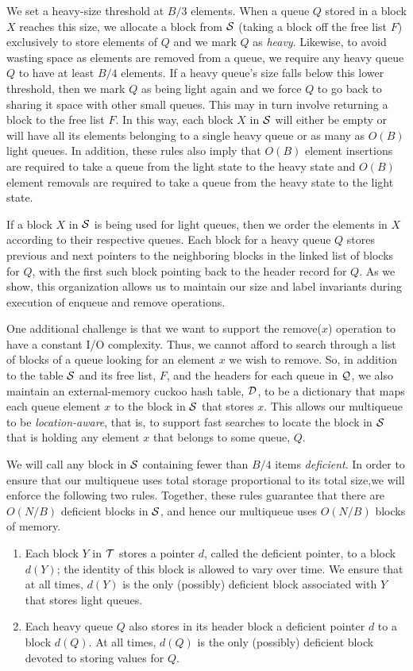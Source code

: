 \documentclass[11pt,letterpaper]{article}
\begin{document}
We set a heavy-size threshold at $B/3$ elements. When a queue $Q$ stored in a block $X$ reaches
this size, we allocate a block from $\cal S$ (taking a block off the free
list $F$) 
exclusively to store elements of $Q$ and we mark $Q$ as \emph{heavy}. 
Likewise, to avoid wasting space as
elements are removed from a queue, we require any heavy queue $Q$ to
have at least $B/4$ elements. If a heavy queue's size falls below this
lower threshold, then we mark $Q$ as being light again
and we force $Q$ to go back to sharing it space with other small queues.
This may in turn involve returning a block to the free list $F$.
In this way,
each block $X$ in $\cal S$ will either be empty or will have all its
elements belonging to a single heavy queue or as many as $O(B)$ light queues.
In addition, these rules also imply that 
$O(B)$ 
element insertions are required to take a queue from the light state to the 
heavy state
and
$O(B)$ 
element removals are required to take a queue from the heavy state to the light
state.

If a block $X$ in $\cal S$ is being used for light queues, 
then we order the elements in $X$ according to their respective queues.
Each block for a heavy queue $Q$ stores previous and next pointers to the
neighboring blocks in the linked list of blocks for $Q$, with 
the first such block pointing back to the header record for $Q$.
As we show, this organization allows us to maintain our size and label
invariants during execution of enqueue and remove operations.

One additional challenge is that we want to support the remove($x$) operation
to have a constant I/O complexity.
Thus, we cannot afford to search through a list of blocks of a queue looking
for an element $x$ we wish to remove.
So, in addition to the table $\cal S$ and its free list, $F$,
and the headers for each queue in $\cal Q$,
we also maintain an external-memory 
cuckoo hash table, $\cal D$, to be a dictionary that
maps each queue element $x$ to the block in $\cal S$ that stores $x$.
This allows our multiqueue to be \emph{location-aware}, that is, to
support fast searches to locate the block in $\cal S$ that is holding
any element $x$ that belongs to some queue, $Q$.

We will call any block in $\cal S$ containing fewer than $B/4$ items \emph{deficient}. 
In order to ensure that our multiqueue uses total storage proportional to its total size,we will enforce the following two rules. Together, these rules guarantee that there are $O(N/B)$ deficient blocks in $\cal S$, and hence our 
multiqueue uses $O(N/B)$ blocks of memory.
\begin{enumerate}
\item Each
block $Y$ in $\cal T$ stores a pointer $d$, called the deficient pointer, to 
a block $d(Y)$; the identity of this block is allowed to vary over time. We ensure that at all times, $d(Y)$ is the only (possibly) deficient block associated with $Y$ that stores light queues.
\item Each heavy queue $Q$ also stores in its header block a deficient pointer $d$ to a block $d(Q)$. At all times, $d(Q)$ is the only (possibly) deficient block devoted to
storing values for $Q$.
\end{enumerate} 
\end{document}
